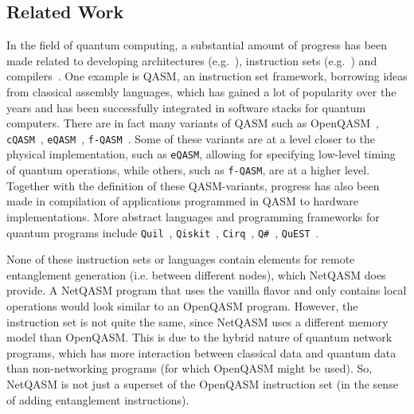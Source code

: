 \subsection{Related Work}
\label{sec:related}
In the field of quantum computing, a substantial amount of progress has been made related to developing
architectures (e.g.~\cite{fu2017microarchitecture,bourassa2020photonicblueprint, murali2019fullstack, wecker2014liqui, khammassi2020openql, amy2019staq, green2013quipper, Steiger2016}),
instruction sets (e.g.~\cite{cross2017openqasm,khammassi2018cqasm,fu2019eqasm,liu2017fqasm,smith2016quil,qiskit,cirq,qsharp,jones2019quest}) and
compilers~\cite{zulehner2019compiling, haner2018software, gokhale2020quantum, liu2020new, gokhale2020optimized, ding2020square, smith2020opensource, Sivarajah_2020, hietala2019verified, zhang2020contextmapping, niu2020hardware, dury2020qubo, pozzi2020using, Nishio_2020}.
One example is QASM, an instruction set framework, borrowing ideas from classical assembly languages, which has gained a lot of popularity over the years and has been successfully integrated in software stacks for quantum computers.
There are in fact many variants of QASM such as OpenQASM~\cite{cross2017openqasm}, \texttt{cQASM}~\cite{khammassi2018cqasm}, \texttt{eQASM}~\cite{fu2019eqasm}, \texttt{f-QASM}~\cite{liu2017fqasm}.
Some of these variants are at a level closer to the physical implementation, such as \texttt{eQASM}, allowing for specifying low-level timing of quantum operations, while others, such as \texttt{f-QASM}, are at a higher level.
Together with the definition of these QASM-variants, progress has also been made in compilation of applications programmed in QASM to hardware implementations.
More abstract languages and programming frameworks for quantum programs include \texttt{Quil}~\cite{smith2016quil}, \texttt{Qiskit}~\cite{qiskit}, \texttt{Cirq}~\cite{cirq}, \texttt{Q\#}~\cite{qsharp}, \texttt{QuEST}~\cite{jones2019quest}.

None of these instruction sets or languages contain elements for remote entanglement generation (i.e. between different nodes), which \ac{NetQASM} does provide.
A \ac{NetQASM} program that uses the vanilla flavor and only contains local operations would look similar to an OpenQASM program.
However, the instruction set is not quite the same, since \ac{NetQASM} uses a different memory model than OpenQASM.
This is due to the hybrid nature of quantum network programs, which has more interaction between classical data and quantum data than non-networking programs (for which OpenQASM might be used).
So, \ac{NetQASM} is not just a superset of the OpenQASM instruction set (in the sense of adding entanglement instructions).

